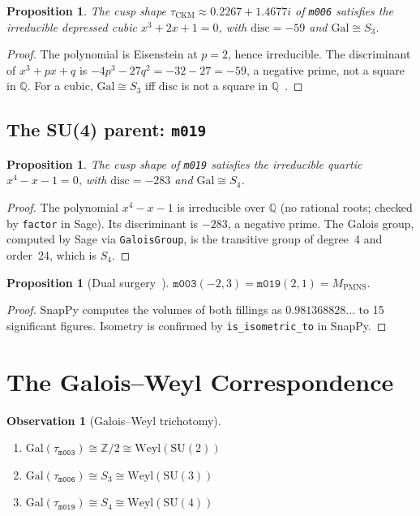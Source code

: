 \documentclass[11pt,a4paper]{article}
\newtheorem{proposition}[theorem]{Proposition}
\theoremstyle{definition}
\newtheorem{observation}[theorem]{Observation}
\theoremstyle{remark}
\newcommand{\Z}{\mathbb{Z}}
\newcommand{\Q}{\mathbb{Q}}
\newcommand{\mfld}[1]{\texttt{#1}}
\newcommand{\Gal}{\mathrm{Gal}}
\newcommand{\SU}{\mathrm{SU}}
\newcommand{\Weyl}{\mathrm{Weyl}}
\newcommand{\disc}{\mathrm{disc}}
\begin{document}
\begin{proposition}\label{prop:m006}
The cusp shape $\tau_{\mathrm{CKM}}\approx 0.2267+1.4677i$
of \mfld{m006} satisfies the irreducible depressed cubic
$x^3+2x+1=0$, with $\disc=-59$ and $\Gal\cong S_3$.
\end{proposition}

\begin{proof}
The polynomial is Eisenstein at $p=2$, hence irreducible.
The discriminant of $x^3+px+q$ is $-4p^3-27q^2=-32-27=-59$,
a negative prime, not a square in $\Q$.
For a cubic, $\Gal\cong S_3$ iff $\disc$ is not a square
in $\Q$~\cite{Lang}.
\end{proof}

\subsection{The SU(4) parent: \mfld{m019}}

\begin{proposition}\label{prop:m019}
The cusp shape of \mfld{m019} satisfies the irreducible
quartic $x^4-x-1=0$, with $\disc=-283$ and $\Gal\cong S_4$.
\end{proposition}

\begin{proof}
The polynomial $x^4-x-1$ is irreducible over $\Q$ (no rational
roots; checked by \texttt{factor} in Sage).
Its discriminant is $-283$, a negative prime.
The Galois group, computed by Sage via \texttt{GaloisGroup},
is the transitive group of degree~4 and order~24,
which is $S_4$.
\end{proof}

\begin{proposition}[Dual surgery~\cite{GentryDual}]\label{prop:dual}
$\mfld{m003}(-2,3) = \mfld{m019}(2,1) = M_{\mathrm{PMNS}}$.
\end{proposition}

\begin{proof}
SnapPy computes the volumes of both fillings as
$0.981368828\ldots$ to 15 significant figures.
Isometry is confirmed by \texttt{is\_isometric\_to} in SnapPy.
\end{proof}

\section{The Galois--Weyl Correspondence}

\begin{observation}[Galois--Weyl trichotomy]\label{obs:main}
\begin{enumerate}
\item $\Gal(\tau_{\mfld{m003}})\cong\Z/2\cong\Weyl(\SU(2))$
\item $\Gal(\tau_{\mfld{m006}})\cong S_3\cong\Weyl(\SU(3))$
\item $\Gal(\tau_{\mfld{m019}})\cong S_4\cong\Weyl(\SU(4))$
\end{enumerate}
\end{observation}
\end{document}
